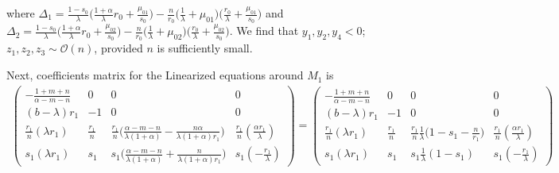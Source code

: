 \documentclass[a4paper,11pt]{article}
\def\BO{{\mathcal{O}}}
\begin{document}
where $\Delta_1 = \frac{1-s_0}{\lambda}\big(\frac{1+\alpha}{\lambda}r_0 + \frac{\mu_{01}}{s_0}\big) -\frac{n}{r_0} \big( \frac{1}{\lambda} + \mu_{01}\big)\big(\frac{r_0}{\lambda} + \frac{\mu_{01}}{s_0}\big)$
and $\Delta_2 = \frac{1-s_0}{\lambda}\big(\frac{1+\alpha}{\lambda}r_0 + \frac{\mu_{02}}{s_0}\big) -\frac{n}{r_0} \big( \frac{1}{\lambda} + \mu_{02}\big)\big(\frac{r_0}{\lambda} + \frac{\mu_{02}}{s_0}\big)$.
We find that $y_1,y_2,y_4<0$; $z_1,z_2,z_3 \sim\BO(n)$, provided $n$ is sufficiently small.

Next, coefficients matrix for the Linearized equations around $M_1$ is
\begin{align*}
 \begin{pmatrix}
          -\frac{1+m+n}{\alpha-m-n} & 0 & 0 & 0\\
          (b-\lambda)r_1 & -1 & 0 & 0\\
          \frac{r_1}{n}(\lambda r_1) & \frac{r_1}{n} & \frac{r_1}{n}\Big(\frac{\alpha-m-n}{\lambda(1+\alpha)} - \frac{n\alpha}{\lambda(1+\alpha)r_1}\Big) & \frac{r_1}{n}(\frac{\alpha r_1}{\lambda})\\
          s_1(\lambda r_1) & s_1 & s_1\Big(\frac{\alpha-m-n}{\lambda(1+\alpha)} + \frac{n}{\lambda(1+\alpha)r_1}\Big) & s_1(-\frac{r_1}{\lambda})
         \end{pmatrix}
         =\begin{pmatrix}
          -\frac{1+m+n}{\alpha-m-n} & 0 & 0 & 0\\
          (b-\lambda)r_1 & -1 & 0 & 0\\
          \frac{r_1}{n}(\lambda r_1) & \frac{r_1}{n} & \frac{r_1}{n}\frac{1}{\lambda}\Big(1-s_1-\frac{n}{r_1}\Big) & \frac{r_1}{n}(\frac{\alpha r_1}{\lambda})\\
          s_1(\lambda r_1) & s_1 & s_1\frac{1}{\lambda}(1-s_1) & s_1(-\frac{r_1}{\lambda})
         \end{pmatrix}
\end{align*}
\end{document}
